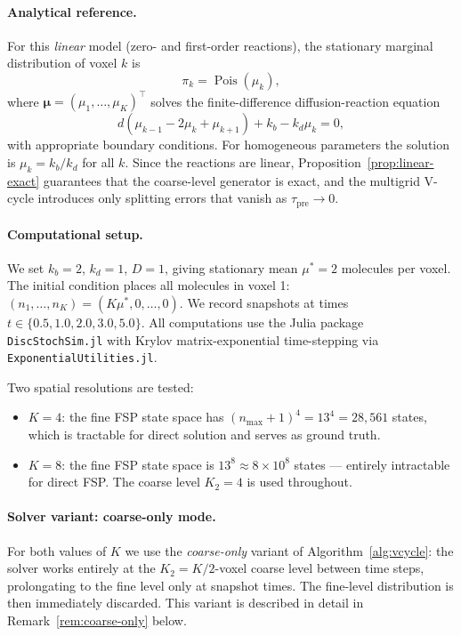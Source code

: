 \documentclass[review,onefignum,onetabnum]{siamart171218}
\newcommand{\Pois}{\operatorname{Pois}}
\begin{document}
\paragraph{Analytical reference.}
For this \emph{linear} model (zero- and first-order reactions),
the stationary marginal distribution of voxel $k$ is
\begin{equation}
  \label{eq:pois-stat}
  \pi_k = \Pois(\mu_k),
\end{equation}
where $\boldsymbol{\mu} = (\mu_1,\ldots,\mu_K)^\top$ solves the
finite-difference diffusion-reaction equation
\begin{equation}
  d(\mu_{k-1} - 2\mu_k + \mu_{k+1}) + k_b - k_d \mu_k = 0,
\end{equation}
with appropriate boundary conditions.  For homogeneous parameters
the solution is $\mu_k = k_b/k_d$ for all $k$.  Since the reactions are
linear, Proposition~\ref{prop:linear-exact} guarantees that the
coarse-level generator is exact, and the multigrid V-cycle
introduces only splitting errors that vanish as $\tau_{\mathrm{pre}} \to 0$.

\paragraph{Computational setup.}
We set $k_b = 2$, $k_d = 1$, $D = 1$, giving stationary mean
$\mu^* = 2$ molecules per voxel.  The initial condition places all
molecules in voxel 1: $(n_1,\ldots,n_K) = (K\mu^*, 0, \ldots, 0)$.
We record snapshots at times $t \in \{0.5, 1.0, 2.0, 3.0, 5.0\}$.
All computations use the Julia package \texttt{DiscStochSim.jl} with
Krylov matrix-exponential time-stepping via \texttt{ExponentialUtilities.jl}.

Two spatial resolutions are tested:
\begin{itemize}
  \item $K = 4$: the fine FSP state space has $(n_{\max}+1)^4 = 13^4 = 28{,}561$
    states, which is tractable for direct solution and serves as ground truth.
  \item $K = 8$: the fine FSP state space is $13^8 \approx 8 \times 10^8$
    states --- entirely intractable for direct FSP.
    The coarse level $K_2 = 4$ is used throughout.
\end{itemize}

\paragraph{Solver variant: coarse-only mode.}
For both values of $K$ we use the \emph{coarse-only} variant of
Algorithm~\ref{alg:vcycle}: the solver works entirely at the
$K_2 = K/2$-voxel coarse level between time steps, prolongating to
the fine level only at snapshot times.  The fine-level distribution
is then immediately discarded.  This variant is described in detail
in Remark~\ref{rem:coarse-only} below.
\end{document}
